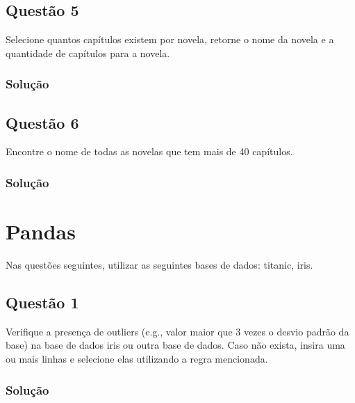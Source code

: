 \documentclass{assignment}
\begin{document}
\subsection*{Questão 5}
Selecione quantos capítulos existem por novela, retorne o nome da novela e a quantidade de
capítulos para a novela.
\subsubsection*{Solução}


\subsection*{Questão 6}
Encontre o nome de todas as novelas que tem mais de 40 capítulos.
\subsubsection*{Solução}


\section*{Pandas}

Nas questões seguintes, utilizar as seguintes bases de dados: titanic, iris.

\subsection*{Questão 1}
Verifique a presença de outliers (e.g., valor maior que 3 vezes o desvio padrão da base) na base
de dados iris ou outra base de dados. Caso não exista, insira uma ou mais linhas e selecione elas
utilizando a regra mencionada.
\subsubsection*{Solução}

\end{document}
